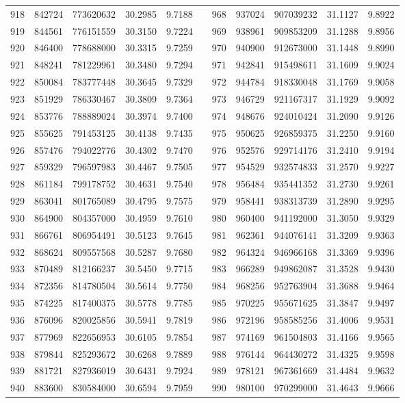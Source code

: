 \begin{longtable}{rrrrrrrrrrr}
918&842724&773620632&30.2985&9.7188&&968&937024&907039232&31.1127&9.8922\\
919&844561&776151559&30.3150&9.7224&&969&938961&909853209&31.1288&9.8956\\
920&846400&778688000&30.3315&9.7259&&970&940900&912673000&31.1448&9.8990\\
921&848241&781229961&30.3480&9.7294&&971&942841&915498611&31.1609&9.9024\\
922&850084&783777448&30.3645&9.7329&&972&944784&918330048&31.1769&9.9058\\
923&851929&786330467&30.3809&9.7364&&973&946729&921167317&31.1929&9.9092\\
924&853776&788889024&30.3974&9.7400&&974&948676&924010424&31.2090&9.9126\\
925&855625&791453125&30.4138&9.7435&&975&950625&926859375&31.2250&9.9160\\
926&857476&794022776&30.4302&9.7470&&976&952576&929714176&31.2410&9.9194\\
927&859329&796597983&30.4467&9.7505&&977&954529&932574833&31.2570&9.9227\\
928&861184&799178752&30.4631&9.7540&&978&956484&935441352&31.2730&9.9261\\
929&863041&801765089&30.4795&9.7575&&979&958441&938313739&31.2890&9.9295\\
930&864900&804357000&30.4959&9.7610&&980&960400&941192000&31.3050&9.9329\\
931&866761&806954491&30.5123&9.7645&&981&962361&944076141&31.3209&9.9363\\
932&868624&809557568&30.5287&9.7680&&982&964324&946966168&31.3369&9.9396\\
933&870489&812166237&30.5450&9.7715&&983&966289&949862087&31.3528&9.9430\\
934&872356&814780504&30.5614&9.7750&&984&968256&952763904&31.3688&9.9464\\
935&874225&817400375&30.5778&9.7785&&985&970225&955671625&31.3847&9.9497\\
936&876096&820025856&30.5941&9.7819&&986&972196&958585256&31.4006&9.9531\\
937&877969&822656953&30.6105&9.7854&&987&974169&961504803&31.4166&9.9565\\
938&879844&825293672&30.6268&9.7889&&988&976144&964430272&31.4325&9.9598\\
939&881721&827936019&30.6431&9.7924&&989&978121&967361669&31.4484&9.9632\\
940&883600&830584000&30.6594&9.7959&&990&980100&970299000&31.4643&9.9666\\

\end{longtable}
